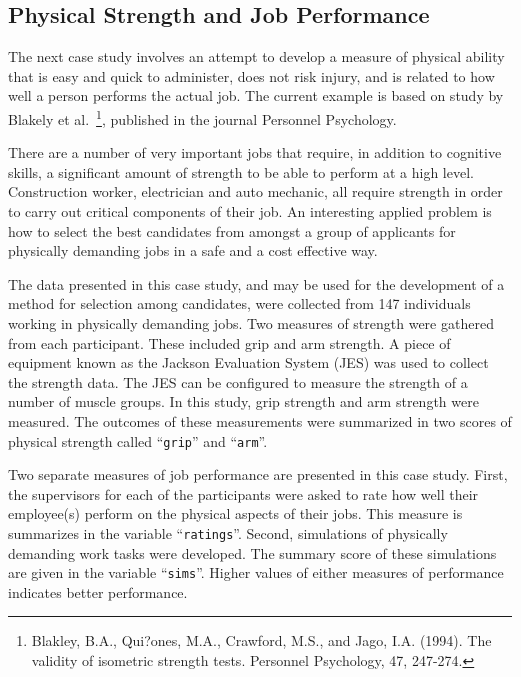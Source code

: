 \documentclass[
]{krantz}
\theoremstyle{definition}
\theoremstyle{definition}
\theoremstyle{definition}
\theoremstyle{remark}
\begin{document}
\hypertarget{physical-strength-and-job-performance}{%
\subsection{Physical Strength and Job Performance}\label{physical-strength-and-job-performance}}

The next case study involves an attempt to develop a measure of physical
ability that is easy and quick to administer, does not risk injury, and
is related to how well a person performs the actual job. The current
example is based on study by Blakely et al.~\footnote{Blakley, B.A., Qui?ones, M.A., Crawford, M.S., and Jago, I.A.
  (1994). The validity of isometric strength tests. Personnel
  Psychology, 47, 247-274.}, published in the
journal Personnel Psychology.

There are a number of very important jobs that require, in addition to
cognitive skills, a significant amount of strength to be able to perform
at a high level. Construction worker, electrician and auto mechanic, all
require strength in order to carry out critical components of their job.
An interesting applied problem is how to select the best candidates from
amongst a group of applicants for physically demanding jobs in a safe
and a cost effective way.

The data presented in this case study, and may be used for the
development of a method for selection among candidates, were collected
from 147 individuals working in physically demanding jobs. Two measures
of strength were gathered from each participant. These included grip and
arm strength. A piece of equipment known as the Jackson Evaluation
System (JES) was used to collect the strength data. The JES can be
configured to measure the strength of a number of muscle groups. In this
study, grip strength and arm strength were measured. The outcomes of
these measurements were summarized in two scores of physical strength
called ``\texttt{grip}'' and ``\texttt{arm}''.

Two separate measures of job performance are presented in this case
study. First, the supervisors for each of the participants were asked to
rate how well their employee(s) perform on the physical aspects of their
jobs. This measure is summarizes in the variable ``\texttt{ratings}''. Second,
simulations of physically demanding work tasks were developed. The
summary score of these simulations are given in the variable ``\texttt{sims}''.
Higher values of either measures of performance indicates better
performance.
\end{document}

